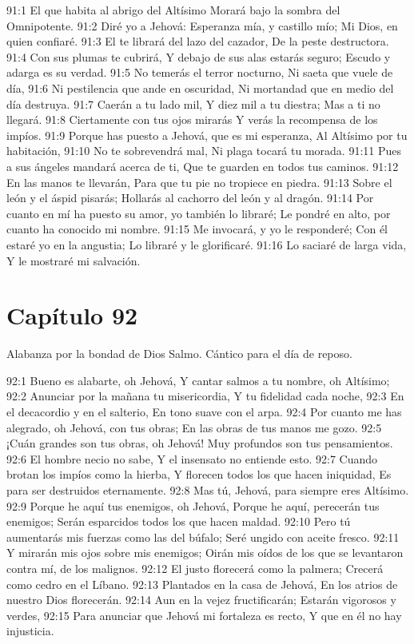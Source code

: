 91:1 El que habita al abrigo del Altísimo 
Morará bajo la sombra del Omnipotente. 
91:2 Diré yo a Jehová: Esperanza mía, y castillo mío; 
Mi Dios, en quien confiaré. 
91:3 El te librará del lazo del cazador, 
De la peste destructora. 
91:4 Con sus plumas te cubrirá, 
Y debajo de sus alas estarás seguro; 
Escudo y adarga es su verdad. 
91:5 No temerás el terror nocturno, 
Ni saeta que vuele de día, 
91:6 Ni pestilencia que ande en oscuridad, 
Ni mortandad que en medio del día destruya. 
91:7 Caerán a tu lado mil, 
Y diez mil a tu diestra; 
Mas a ti no llegará. 
91:8 Ciertamente con tus ojos mirarás 
Y verás la recompensa de los impíos. 
91:9 Porque has puesto a Jehová, que es mi esperanza, 
Al Altísimo por tu habitación, 
91:10 No te sobrevendrá mal, 
Ni plaga tocará tu morada. 
91:11 Pues a sus ángeles mandará acerca de ti, 
Que te guarden en todos tus caminos. 
91:12 En las manos te llevarán, 
Para que tu pie no tropiece en piedra. 
91:13 Sobre el león y el áspid pisarás; 
Hollarás al cachorro del león y al dragón. 
91:14 Por cuanto en mí ha puesto su amor, yo también lo libraré; 
Le pondré en alto, por cuanto ha conocido mi nombre. 
91:15 Me invocará, y yo le responderé; 
Con él estaré yo en la angustia; 
Lo libraré y le glorificaré. 
91:16 Lo saciaré de larga vida, 
Y le mostraré mi salvación. 
\section*{Capítulo 92}
Alabanza por la bondad de Dios 
Salmo. Cántico para el día de reposo. 
 
92:1 Bueno es alabarte, oh Jehová, 
Y cantar salmos a tu nombre, oh Altísimo; 
92:2 Anunciar por la mañana tu misericordia, 
Y tu fidelidad cada noche, 
92:3 En el decacordio y en el salterio, 
En tono suave con el arpa. 
92:4 Por cuanto me has alegrado, oh Jehová, con tus obras; 
En las obras de tus manos me gozo. 
92:5 ¡Cuán grandes son tus obras, oh Jehová! 
Muy profundos son tus pensamientos. 
92:6 El hombre necio no sabe, 
Y el insensato no entiende esto. 
92:7 Cuando brotan los impíos como la hierba, 
Y florecen todos los que hacen iniquidad, 
Es para ser destruidos eternamente. 
92:8 Mas tú, Jehová, para siempre eres Altísimo. 
92:9 Porque he aquí tus enemigos, oh Jehová, 
Porque he aquí, perecerán tus enemigos; 
Serán esparcidos todos los que hacen maldad. 
92:10 Pero tú aumentarás mis fuerzas como las del búfalo; 
Seré ungido con aceite fresco. 
92:11 Y mirarán mis ojos sobre mis enemigos; 
Oirán mis oídos de los que se levantaron contra mí, de los malignos. 
92:12 El justo florecerá como la palmera; 
Crecerá como cedro en el Líbano. 
92:13 Plantados en la casa de Jehová, 
En los atrios de nuestro Dios florecerán. 
92:14 Aun en la vejez fructificarán; 
Estarán vigorosos y verdes, 
92:15 Para anunciar que Jehová mi fortaleza es recto, 
Y que en él no hay injusticia. 
